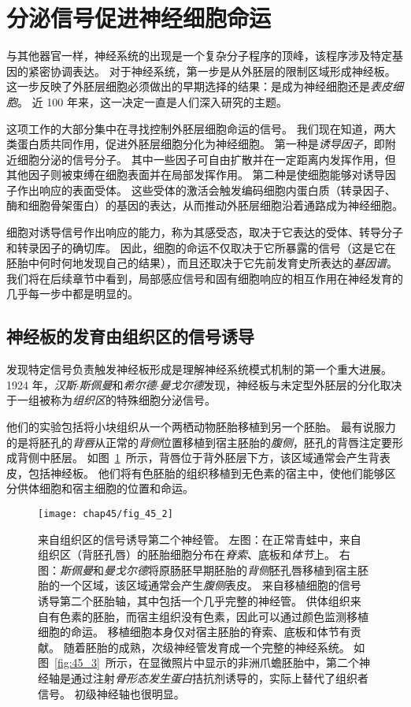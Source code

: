 \section{分泌信号促进神经细胞命运}

与其他器官一样，神经系统的出现是一个复杂分子程序的顶峰，该程序涉及特定基因的紧密协调表达。
对于神经系统，第一步是从外胚层的限制区域形成神经板。
这一步反映了外胚层细胞必须做出的早期选择的结果：是成为神经细胞还是\textit{表皮细胞}。
近 100 年来，这一决定一直是人们深入研究的主题。


这项工作的大部分集中在寻找控制外胚层细胞命运的信号。
我们现在知道，两大类蛋白质共同作用，促进外胚层细胞分化为神经细胞。
第一种是\textit{诱导因子}，即附近细胞分泌的信号分子。
其中一些因子可自由扩散并在一定距离内发挥作用，但其他因子则被束缚在细胞表面并在局部发挥作用。
第二种是使细胞能够对诱导因子作出响应的表面受体。
这些受体的激活会触发编码细胞内蛋白质（转录因子、酶和细胞骨架蛋白）的基因的表达，从而推动外胚层细胞沿着通路成为神经细胞。


细胞对诱导信号作出响应的能力，称为其感受态，取决于它表达的受体、转导分子和转录因子的确切库。
因此，细胞的命运不仅取决于它所暴露的信号（这是它在胚胎中何时何地发现自己的结果），而且还取决于它先前发育史所表达的\textit{基因谱}。
我们将在后续章节中看到，局部感应信号和固有细胞响应的相互作用在神经发育的几乎每一步中都是明显的。



\subsection{神经板的发育由组织区的信号诱导}

发现特定信号负责触发神经板形成是理解神经系统模式机制的第一个重大进展。
1924 年，\textit{汉斯$\cdot$斯佩曼}和\textit{希尔德$\cdot$曼戈尔德}发现，神经板与未定型外胚层的分化取决于一组被称为\textit{组织区}的特殊细胞分泌信号。


他们的实验包括将小块组织从一个两栖动物胚胎移植到另一个胚胎。
最有说服力的是将胚孔的\textit{背唇}从正常的\textit{背侧}位置移植到宿主胚胎的\textit{腹侧}，胚孔的背唇注定要形成背侧中胚层。
如图~\ref{fig:45_2}~所示，背唇位于背外胚层下方，该区域通常会产生背表皮，包括神经板。
他们将有色胚胎的组织移植到无色素的宿主中，使他们能够区分供体细胞和宿主细胞的位置和命运。


\begin{figure}[htbp]
	\centering
	\texttt{[image: chap45/fig\_45\_2]}
	\caption{来自组织区的信号诱导第二个神经管。
		左图：在正常青蛙中，来自组织区（背胚孔唇）的胚胎细胞分布在\textit{脊索}、底板和\textit{体节}上。
		右图：\textit{斯佩曼}和\textit{曼戈尔德}将原肠胚早期胚胎的\textit{背侧}胚孔唇移植到宿主胚胎的一个区域，该区域通常会产生\textit{腹侧}表皮。
		来自移植细胞的信号诱导第二个胚胎轴，其中包括一个几乎完整的神经管。
		供体组织来自有色素的胚胎，而宿主组织没有色素，因此可以通过颜色监测移植细胞的命运。
		移植细胞本身仅对宿主胚胎的脊索、底板和体节有贡献。
		随着胚胎的成熟，次级神经管发育成一个完整的神经系统。
		如图~\ref{fig:45_3}~所示，在显微照片中显示的非洲爪蟾胚胎中，第二个神经轴是通过注射\textit{骨形态发生蛋白}拮抗剂诱导的，实际上替代了组织者信号。
		初级神经轴也很明显。}
	\label{fig:45_2}
\end{figure}


